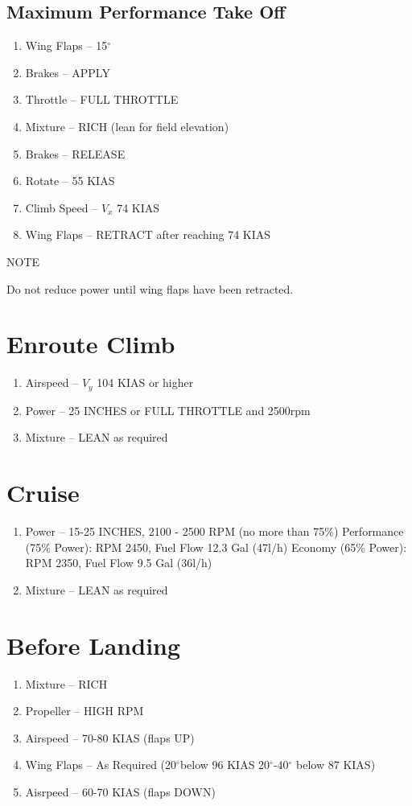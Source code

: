 \subsection{Maximum Performance Take Off}
\begin{enumerate}[(1)]
  \item Wing Flaps -- 15$^{\circ}$
  \item Brakes -- APPLY
  \item Throttle -- FULL THROTTLE  
  \item Mixture -- RICH (lean for field elevation)
  \item Brakes -- RELEASE
  \item Rotate -- 55 KIAS
  \item Climb Speed -- $V_x$ 74 KIAS 
  \item Wing Flaps -- RETRACT after reaching 74 KIAS
\end{enumerate}
\begin{center}
NOTE

Do not reduce power until wing flaps have been retracted.
\end{center}

\section{Enroute Climb}
\begin{enumerate}[(1)]
  \item Airspeed -- $V_y$ 104 KIAS or higher
  \item Power -- 25 INCHES or FULL THROTTLE and 2500rpm 
  \item Mixture -- LEAN as required
\end{enumerate}

\section{Cruise}
\begin{enumerate}[(1)]
\item Power -- 15-25 INCHES, 2100 - 2500 RPM (no more than 75\%)
\subitem Performance (75\% Power): RPM 2450, Fuel Flow 12.3 Gal (47l/h) %
\subitem Economy (65\% Power): RPM 2350, Fuel Flow 9.5 Gal (36l/h) %
\item Mixture -- LEAN as required
\end{enumerate}

\section{Before Landing}
\begin{enumerate}[(1)]
\item Mixture -- RICH
\item Propeller -- HIGH RPM
\item Airspeed -- 70-80 KIAS (flaps UP)
\item Wing Flaps -- As Required (20$^{\circ}$below 96 KIAS 20$^{\circ}$-40$^{\circ}$ below 87 KIAS)
\item Aisrpeed -- 60-70 KIAS (flaps DOWN)
\end{enumerate}

